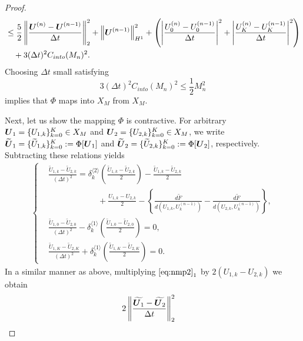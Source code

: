 \documentclass[dvipdfmx-if-dvi,autodetect-engine,ja=standard]{amsart}
\numberwithin{equation}{section} %
\def\vect#1{\mbox{\boldmath $#1$}} %
\begin{document}
\begin{proof}
\begin{align*}
&\leq \frac{5}{2} \left\| \frac{\vect{U}^{(n)} -\vect{U}^{(n-1)}}{\Delta t} \right\|_2^2 + \left\| \vect{U}^{(n-1)} \right\|_{H^1}^2 
+ \left(
\left| \frac{U_0^{(n)} - U_0^{(n-1)}}{\Delta t} \right|^2
+ \left| \frac{U_K^{(n)} - U_K^{(n-1)}}{\Delta t} \right|^2
\right)  \\
&\quad + 3 (\Delta t)^2 C_{into}(M_n)^2. 
\end{align*}
Choosing $\Delta t$ small satisfying 
\begin{equation}\label{eq:into}
   3 (\Delta t)^2 C_{into}(M_n)^2 \leq \frac{1}{2} M_n^2 
\end{equation} 
implies that $\Phi$ maps into $X_M$ from $X_M$. 

Next, let us show the mapping $\Phi$ is contractive.
For arbitrary
$\vect{U}_1 = \{ U_{1,k} \}_{k=0}^K \in X_M$
and
$\vect{U}_2 = \{ U_{2,k} \}_{k=0}^K \in X_M$,
we write
$\widetilde{\vect{U}}_1 =
\{ \widetilde{U}_{1,k} \}_{k=0}^K := \Phi[\vect{U}_1]$ 
and $\widetilde{\vect{U}}_2 = \{ \widetilde{U}_{2,k} \}_{k=0}^K := \Phi[\vect{U}_2]$, respectively.  
Subtracting these relations yields 
\begin{align}\label{eq:nmp2}
    \left\{
    \begin{alignedat}{1}
    &\frac{\widetilde{U}_{1,k} - \widetilde{U}_{2,k}}{(\Delta t)^2}  
    = \delta_k^{\langle 2 \rangle}
    \left(
        \frac{\widetilde{U}_{1,k} - \widetilde{U}_{2,k}}{2}
    \right)
    - \frac{\widetilde{U}_{1,k} - \widetilde{U}_{2,k}}{2} \\
    &\qquad \qquad \qquad + \frac{U_{1,k} - U_{2,k}}{2}
    - \left\{ \frac{d \tilde{F}}{d(U_{1,k}, U_k^{(n-1)})}
    - \frac{d \tilde{F}}{d(U_{2,k}, U_k^{(n-1)})} \right\},\\
    &\frac{\widetilde{U}_{1,0} - \widetilde{U}_{2,0}}{(\Delta t)^2} 
        - \delta_k^{\langle 1 \rangle}
        \left(
            \frac{\widetilde{U}_{1,0} - \widetilde{U}_{2,0}}{2}
        \right)
        = 0,\\
    &\frac{\widetilde{U}_{1,K} - \widetilde{U}_{2,K}}{(\Delta t)^2} 
       + \delta_k^{\langle 1 \rangle}
        \left(
            \frac{\widetilde{U}_{1,K} - \widetilde{U}_{2,K}}{2}
        \right)
        = 0.
    \end{alignedat}
    \right.
\end{align}
In a similar manner as above, multiplying
$\eqref{eq:nmp2}_1$
by $2(U_{1,k}-U_{2,k})$ we obtain 
\begin{align*}
    &2 \left\| \frac{\widetilde{\vect{U}_1} - \widetilde{\vect{U}_2}}{\Delta t} \right\|_2^2 

\end{align*}
\end{proof}
\end{document}
